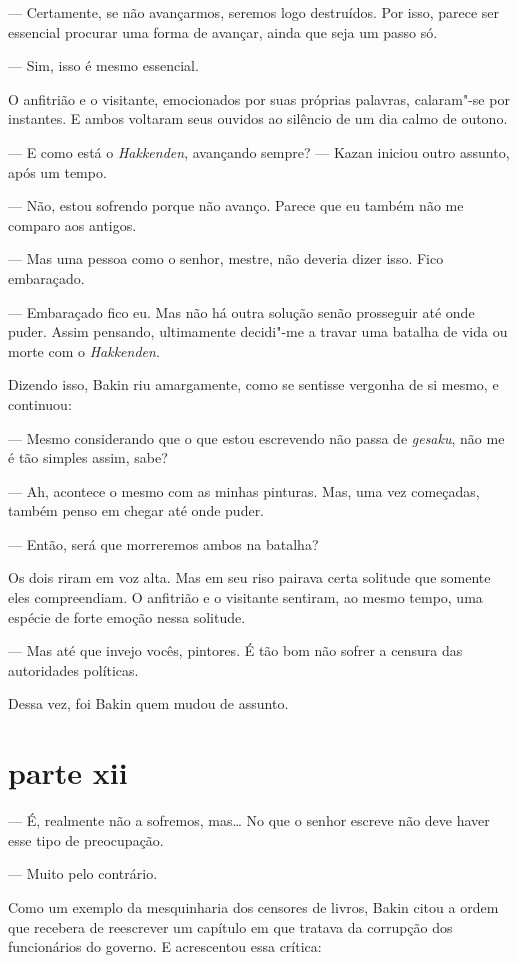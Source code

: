 --- Certamente, se não avançarmos, seremos logo destruídos. Por isso,
parece ser essencial procurar uma forma de avançar, ainda que seja um
passo só.

--- Sim, isso é mesmo essencial.

O anfitrião e o visitante, emocionados por suas próprias palavras,
calaram"-se por instantes. E ambos voltaram seus ouvidos ao silêncio de
um dia calmo de outono.

--- E como está o \textit{Hakkenden}, avançando sempre? --- Kazan iniciou
outro assunto, após um tempo.

--- Não, estou sofrendo porque não avanço. Parece que eu também não me
comparo aos antigos.

--- Mas uma pessoa como o senhor, mestre, não deveria dizer isso. Fico
embaraçado.

--- Embaraçado fico eu. Mas não há outra solução senão prosseguir até onde
puder. Assim pensando, ultimamente decidi"-me a travar uma batalha de
vida ou morte com o \textit{Hakkenden}.

Dizendo isso, Bakin riu amargamente, como se sentisse vergonha de si
mesmo, e continuou:

--- Mesmo considerando que o que estou escrevendo não passa de
\textit{gesaku}, não me é tão simples assim, sabe? 

--- Ah, acontece o mesmo com as minhas pinturas. Mas, uma vez começadas,
também penso em chegar até onde puder.

--- Então, será que morreremos ambos na batalha?

Os dois riram em voz alta. Mas em seu riso pairava certa solitude que
somente eles compreendiam. O anfitrião e o visitante sentiram, ao mesmo
tempo, uma espécie de forte emoção nessa solitude. 

--- Mas até que invejo vocês, pintores. É tão bom não sofrer a censura das
autoridades políticas.

Dessa vez, foi Bakin quem mudou de assunto.

\section*{parte xii}

--- É, realmente não a sofremos, mas\ldots{} No que o senhor escreve não deve
haver esse tipo de preocupação.

--- Muito pelo contrário.

Como um exemplo da mesquinharia dos censores de livros, Bakin citou a
ordem que recebera de reescrever um capítulo em que tratava da
corrupção dos funcionários do governo. E acrescentou essa crítica:


